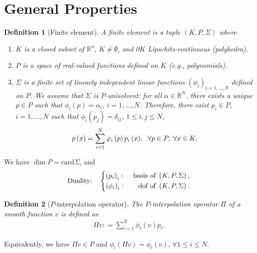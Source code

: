 \documentclass[11pt,a4paper,center,notitlepage]{article}
\numberwithin{equation}{section}
\newtheorem{definition}{Definition}[section]
\begin{document}
\section{General Properties}
\begin{definition}[Finite element]
A \emph{finite element} is a tuple $\left(K,P,\Sigma\right)$ where
\begin{enumerate}
\item $K$ is a closed subset of $\mathbb{R}^n$, $K\ne \emptyset$, and $\partial K$ Lipschitz-continuous (polyhedra).
\item $P$ is a space of real-valued functions defined on $K$ (e.g., polynomials).
\item $\Sigma$ is a finite set of linearly independent linear functions $\left( {{\phi _i}} \right)_{i = 1, \ldots ,N}$ defined on $P$. We assume that $\Sigma$ is $P$-unisolvent: for all  $\alpha \in \mathbb{R}^N$, there exists a unique $p\in P$ such that $\phi _i\left(p\right) =\alpha _i$, $i=1,\ldots,N$. Therefore, there exist $p_i \in P$, $i=1,\ldots,N$ such that $\phi _i\left(p_j\right) =\delta _{ij}$, $1\le i,j\le N$,
\begin{align}
p\left( x \right) = \sum\limits_{i = 1}^N {{\varphi _i}\left( p \right){p_i}\left( x \right)} ,\hspace{2mm}\forall p \in P,\hspace{1mm}\forall x \in K.
\end{align}
\end{enumerate} 
\end{definition}
We have $\dim P =\mbox{card} \Sigma$, and
\begin{equation}
\mbox{Duality: } \hspace{2mm}\left\{ \begin{split}
&{{\left( {{p_i}} \right)}_i}: & \mbox{ basis of } \left( {K,P,\Sigma } \right),\\
&{{\left( {{\phi _i}} \right)}_i}: & \mbox{ dof of } \left( {K,P,\Sigma } \right).
\end{split} \right.
\end{equation}

\begin{definition}[$P$-interpolation operator]
The \emph{$P$-interpolation operator} $\Pi$ of a smooth function $v$ is defined as 
\begin{align}
\Pi v: = \sum\limits_{i = 1}^N {{\phi _i}\left( v \right){p_i}} .
\end{align}
\end{definition}
Equivalently, we have $\Pi v \in P$ and ${\phi _i}\left( {\Pi v} \right) = \overline {{\phi _i}} \left( v \right)$, $\forall 1 \le i \le N$. 
\end{document}
